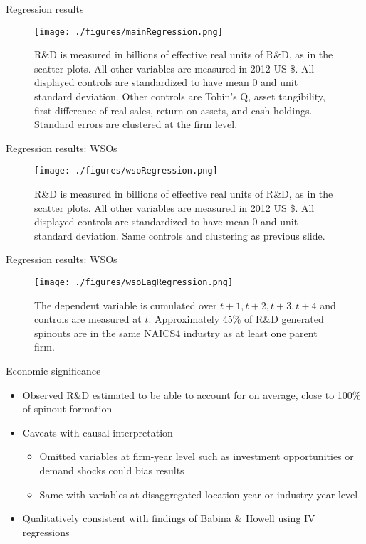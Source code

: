 \documentclass[english,usenames,dvipsnames]{beamer}
\begin{document}
\begin{frame}{Regression results}
\begin{figure}
	\texttt{[image: ./figures/mainRegression.png]}
	\caption{\scriptsize R\&D is measured in billions of effective real units of R\&D, as in the scatter plots. All other variables are measured in 2012 US \$. All displayed controls are standardized to have mean 0 and unit standard deviation. Other controls are Tobin's Q, asset tangibility, first difference of real sales, return on assets, and cash holdings. Standard errors are clustered at the firm level.}
\end{figure}
\end{frame}

\begin{frame}{Regression results: WSOs}
\begin{figure}
	\texttt{[image: ./figures/wsoRegression.png]}
	\caption{\scriptsize R\&D is measured in billions of effective real units of R\&D, as in the scatter plots. All other variables are measured in 2012 US \$. All displayed controls are standardized to have mean 0 and unit standard deviation. Same controls and clustering as previous slide.}
\end{figure}
\end{frame}

\begin{frame}{Regression results: WSOs}
\begin{figure}
	\texttt{[image: ./figures/wsoLagRegression.png]}
	\caption{\scriptsize The dependent variable is cumulated over $t+1,t+2,t+3,t+4$ and controls are measured at $t$. Approximately 45\% of R\&D generated spinouts are in the same NAICS4 industry as at least one parent firm.}
\end{figure}
\end{frame}



\begin{frame}{Economic significance}
\begin{itemize}
	\item Observed R\&D estimated to be able to account for on average, close to 100\% of spinout formation
	\item Caveats with causal interpretation
	\begin{itemize}
		\item Omitted variables at firm-year level such as investment opportunities or demand shocks could bias results 
		\item Same with variables at disaggregated location-year or industry-year level
	\end{itemize}
	\item Qualitatively consistent with findings of Babina \& Howell using IV regressions
\end{itemize}
\end{frame}
\end{document}
